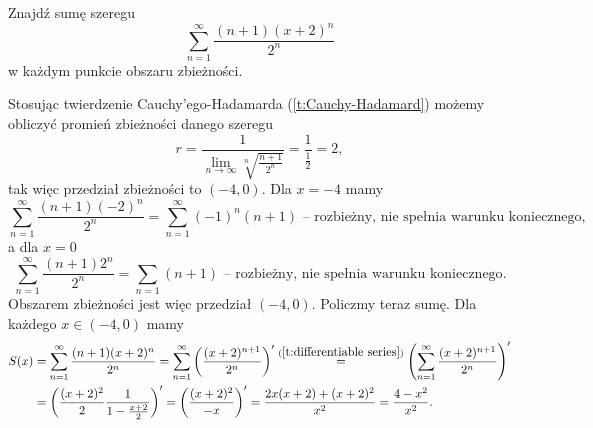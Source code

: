 \begin{example}
    Znajdź sumę szeregu
    \[ \sum_{n=1}^\infty\frac{(n+1)(x+2)^n}{2^n} \]
    w każdym punkcie obszaru zbieżności.
\end{example}
\begin{solution}
    Stosując twierdzenie Cauchy'ego-Hadamarda (\ref{t:Cauchy-Hadamard}) możemy obliczyć promień zbieżności danego szeregu
    \[ r = \frac{1}{\lim\limits_{n\to\infty}\sqrt[n]{\frac{n+1}{2^n}}} = \frac{1}{\frac{1}{2}} = 2, \]
    tak więc przedział zbieżności to $(-4, 0)$.
    Dla $x = -4$ mamy
    \[ \sum_{n=1}^\infty\frac{(n+1)(-2)^n}{2^n} = \sum_{n=1}^\infty(-1)^n(n+1) \text{ -- rozbieżny, nie spełnia warunku koniecznego}, \]
    a dla $x = 0$
    \[ \sum_{n=1}^\infty\frac{(n+1)2^n}{2^n} = \sum_{n=1}(n+1) \text{ -- rozbieżny, nie spełnia warunku koniecznego}. \]
    Obszarem zbieżności jest więc przedział $(-4, 0)$. Policzmy teraz sumę. Dla każdego $x \in (-4, 0)$ mamy
    \begin{align*}
        S(x) &= \sum_{n=1}^\infty\frac{(n+1)(x+2)^n}{2^n} = \sum_{n=1}^\infty \left(\frac{(x+2)^{n+1}}{2^n}\right)' \overset{(\ref{t:differentiable series})}{=} \left(\sum_{n=1}^\infty\frac{(x+2)^{n+1}}{2^n}\right)' \\
        &= \left(\frac{(x+2)^2}{2}\frac{1}{1 - \frac{x+2}{2}}\right)' = \left(\frac{(x+2)^2}{-x}\right)' = \frac{2x(x+2) + (x+2)^2}{x^2} = \frac{4 - x^2}{x^2}.
    \end{align*}
\end{solution}

